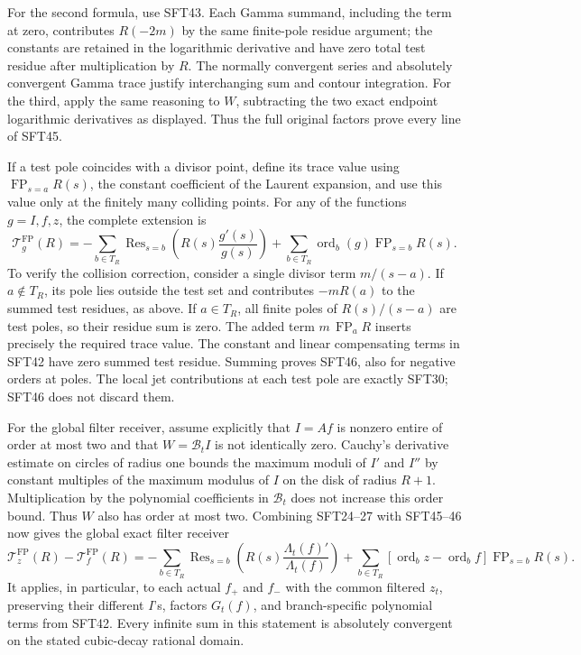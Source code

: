 \documentclass[
  10pt,
  a4paper,
]{article}
\begin{document}
For the second formula, use SFT43. Each Gamma summand, including the
term at zero, contributes \(R(-2m)\) by the same finite-pole residue
argument; the constants are retained in the logarithmic derivative and
have zero total test residue after multiplication by \(R\). The normally
convergent series and absolutely convergent Gamma trace justify
interchanging sum and contour integration. For the third, apply the same
reasoning to \(W\), subtracting the two exact endpoint logarithmic
derivatives as displayed. Thus the full original factors prove every
line of SFT45.

If a test pole coincides with a divisor point, define its trace value
using \(\operatorname{FP}_{s=a}R(s)\), the constant coefficient of the
Laurent expansion, and use this value only at the finitely many
colliding points. For any of the functions \(g=I,f,z\), the complete
extension is \[
 \boxed{\displaystyle
 \mathscr T_g^{\mathrm{FP}}(R)
     =-\sum_{b\in T_R}\operatorname{Res}_{s=b}
                         \left(R(s)\frac{g'(s)}{g(s)}\right)
       +\sum_{b\in T_R}
            \operatorname{ord}_b(g)\operatorname{FP}_{s=b}R(s).}
 \tag{SFT46}
\] To verify the collision correction, consider a single divisor term
\(m/(s-a)\). If \(a\notin T_R\), its pole lies outside the test set and
contributes \(-mR(a)\) to the summed test residues, as above. If
\(a\in T_R\), all finite poles of \(R(s)/(s-a)\) are test poles, so
their residue sum is zero. The added term \(m\,\operatorname{FP}_aR\)
inserts precisely the required trace value. The constant and linear
compensating terms in SFT42 have zero summed test residue. Summing
proves SFT46, also for negative orders at poles. The local jet
contributions at each test pole are exactly SFT30; SFT46 does not
discard them.

For the global filter receiver, assume explicitly that \(I=Af\) is
nonzero entire of order at most two and that \(W=\mathcal B_tI\) is not
identically zero. Cauchy's derivative estimate on circles of radius one
bounds the maximum moduli of \(I'\) and \(I''\) by constant multiples of
the maximum modulus of \(I\) on the disk of radius \(R+1\).
Multiplication by the polynomial coefficients in \(\mathcal B_t\) does
not increase this order bound. Thus \(W\) also has order at most two.
Combining SFT24--27 with SFT45--46 now gives the global exact filter
receiver \[
 \boxed{\displaystyle
 \mathscr T_z^{\mathrm{FP}}(R)-\mathscr T_f^{\mathrm{FP}}(R)
     =-\sum_{b\in T_R}\operatorname{Res}_{s=b}
                         \left(R(s)\frac{\Lambda_t(f)'}{\Lambda_t(f)}\right)
       +\sum_{b\in T_R}
        [\operatorname{ord}_b z-\operatorname{ord}_b f]
                                    \operatorname{FP}_{s=b}R(s).}
 \tag{SFT47}
\] It applies, in particular, to each actual \(f_+\) and \(f_-\) with
the common filtered \(z_t\), preserving their different \(I\)'s, factors
\(G_t(f)\), and branch-specific polynomial terms from SFT42. Every
infinite sum in this statement is absolutely convergent on the stated
cubic-decay rational domain.
\end{document}
